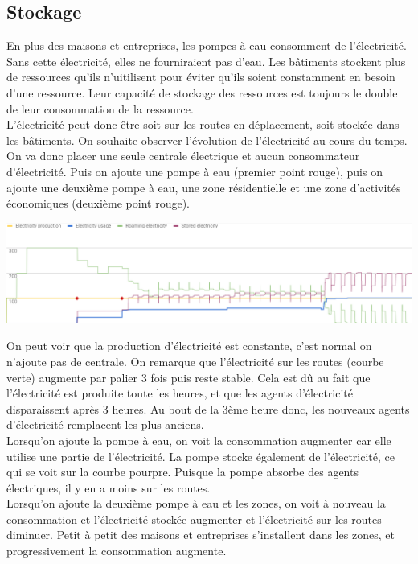 \documentclass[11pt]{report}
\begin{document}
\subsection{Stockage}
En plus des maisons et entreprises, les pompes à eau consomment de l'électricité. Sans cette électricité, elles ne fourniraient pas d'eau.
Les bâtiments stockent plus de ressources qu'ils n'uitilisent pour éviter qu'ils soient constamment en besoin d'une ressource. Leur capacité de stockage des ressources est toujours le double de leur consommation de la ressource.\\
L'électricité peut donc être soit sur les routes en déplacement, soit stockée dans les bâtiments. On souhaite observer l'évolution de l'électricité au cours du temps. On va donc placer une seule centrale électrique et aucun consommateur d'électricité. Puis on ajoute une pompe à eau (premier point rouge), puis on ajoute une deuxième pompe à eau, une zone résidentielle et une zone d'activités économiques (deuxième point rouge).
\begin{center}
	\includegraphics[width=\textwidth]{electricity_storage}
\end{center}
On peut voir que la production d'électricité est constante, c'est normal on n'ajoute pas de centrale.
On remarque que l'électricité sur les routes (courbe verte) augmente par palier 3 fois puis reste stable. Cela est dû au fait que l'électricité est produite toute les heures, et que les agents d'électricité disparaissent après 3 heures. Au bout de la 3ème heure donc, les nouveaux agents d'électricité remplacent les plus anciens.\\
Lorsqu'on ajoute la pompe à eau, on voit la consommation augmenter car elle utilise une partie de l'électricité. La pompe stocke également de l'électricité, ce qui se voit sur la courbe pourpre. Puisque la pompe absorbe des agents électriques, il y en a moins sur les routes.\\
Lorsqu'on ajoute la deuxième pompe à eau et les zones, on voit à nouveau la consommation et l'électricité stockée augmenter et l'électricité sur les routes diminuer. Petit à petit des maisons et entreprises s'installent dans les zones, et progressivement la consommation augmente.
\end{document}
